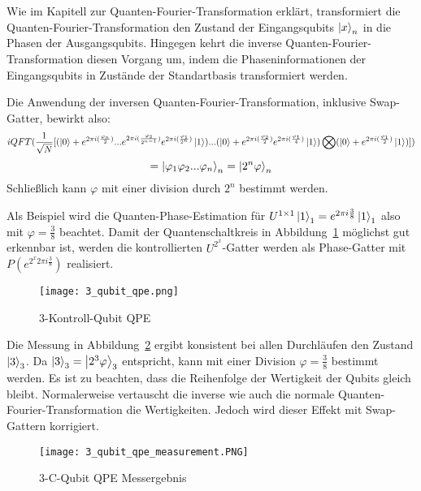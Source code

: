 Wie im Kapitell zur Quanten-Fourier-Transformation erklärt,
transformiert die Quanten-Fourier-Transformation den Zustand der Eingangsqubits \(\ket{x}_n\) in die Phasen der Ausgangsqubits.
Hingegen kehrt die inverse Quanten-Fourier-Transformation diesen Vorgang um, 
indem die Phaseninformationen der Eingangsqubits in Zustände der Standartbasis transformiert werden.

Die Anwendung der inversen Quanten-Fourier-Transformation, inklusive Swap-Gatter, bewirkt also:
\[iQFT(\frac{1}{\sqrt{N}}[
  (\ket{0} + e^{2\pi i (\frac{\varphi_n}{2})} ... e^{2\pi i (\frac{\varphi_2}{2^{n-1}})}e^{2\pi i (\frac{\varphi_1}{2^{n}})}\ket{1})  ... 
  (\ket{0} +  e^{2\pi i (\frac{\varphi_2}{2})}e^{2\pi i (\frac{\varphi_1}{4})}\ket{1}) \bigotimes 
  (\ket{0} + e^{2\pi i (\frac{\varphi_1}{2})}\ket{1}) 
])\]
\[ = \ket{\varphi_1 \varphi_{2}...\varphi_n}_n = \ket{2^n\varphi}_n\]
Schließlich kann \(\varphi\) mit einer division durch \(2^n\) bestimmt werden.

Als Beispiel wird die Quanten-Phase-Estimation für
\(U^{1\times 1}\ket{1}_1=e^{2\pi i \frac{3}{8}}\ket{1}_1\) also mit \(\varphi = \frac{3}{8}\)
beachtet.
Damit der Quantenschaltkreis in Abbildung~\ref{fig:3_qubit_qpe} möglichst gut erkennbar ist,
werden die kontrollierten \(U^{2^x}\)-Gatter werden als Phase-Gatter mit \(P(e^{2^x 2\pi i \frac{3}{8}})\) realisiert.
\begin{figure}
  \caption{3-Kontroll-Qubit QPE}
  \label{fig:3_qubit_qpe}
  \texttt{[image: 3\_qubit\_qpe.png]}
  \centering
  \end{figure}
Die Messung in Abbildung~\ref{fig:3_qubit_qpe_measurement} ergibt konsistent bei allen Durchläufen den Zustand \(\ket{3}_3\).
Da \(\ket{3}_3 = \ket{2^3\varphi}_3\) entspricht, kann mit einer Division \(\varphi = \frac{3}{8}\) bestimmt werden.
Es ist zu beachten, dass die Reihenfolge der Wertigkeit der Qubits gleich bleibt.
Normalerweise vertauscht die inverse wie auch die normale Quanten-Fourier-Transformation die Wertigkeiten.
Jedoch wird dieser Effekt mit Swap-Gattern korrigiert.
\begin{figure}
\caption{3-C-Qubit QPE Messergebnis}
\label{fig:3_qubit_qpe_measurement}
\texttt{[image: 3\_qubit\_qpe\_measurement.PNG]}
\centering
\end{figure}

